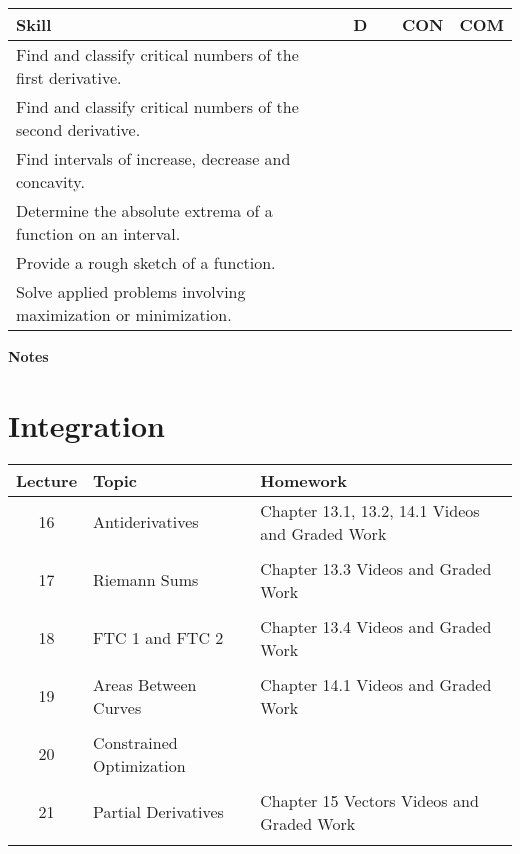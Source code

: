 \documentclass[10pt]{book}
\theoremstyle{definition}
\theoremstyle{remark}
\begin{document}
\begin{large}
\begin{center}
\begin{tabular}{|l|l|l|l|}
\hline
\textbf{Skill} & \textbf{~~D~~} & \textbf{CON} & \textbf{COM} \\
\hline
Find and classify critical numbers of the first derivative.&&&\\
\hline
Find and classify critical numbers of the second derivative.&&&\\
\hline
Find intervals of increase, decrease and concavity.&&&\\
\hline
Determine the absolute extrema of a function on an interval.&&&\\
\hline
Provide a rough sketch of a function.&&&\\
\hline
Solve applied problems involving maximization or minimization.&&&\\
\hline
\end{tabular}
\end{center}
\vfil

\noindent
\textbf{Notes}
\end{large} \vfil
\newpage

\chapter{Integration}

\begin{tabular}{cp{1.95in}p{3.25in}}
Lecture & Topic & Homework\\
\hline
16	&	Antiderivatives				&	Chapter 13.1, 13.2, 14.1 Videos and Graded Work\\ \\
17	&	Riemann Sums				&	Chapter 13.3 Videos and Graded Work\\\\
18	&	FTC 1 and FTC 2				&	Chapter 13.4 Videos and Graded Work\\\\
19	&	Areas Between Curves			&	Chapter 14.1 Videos and Graded Work\\\\
20	&	Constrained Optimization		&	\\\\
21	&	Partial Derivatives				&	Chapter 15 Vectors Videos and Graded Work\\\\
\end{tabular}
\newpage

\end{document}
